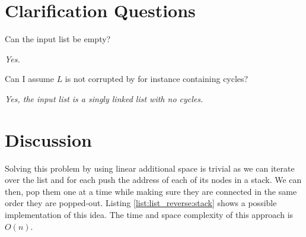

\section{Clarification Questions}

\begin{QandA}
	\item \begin{questionitem} \begin{question} Can the input list be empty?   \end{question} 	 
    \begin{answered}
		\textit{Yes.}
	\end{answered} \end{questionitem}

	\item \begin{questionitem} \begin{question} Can I assume $L$ is not corrupted by for instance containing cycles?   \end{question} 	 
    \begin{answered}
		\textit{Yes, the input list is a singly linked list with no cycles.}
	\end{answered} \end{questionitem}
	
\end{QandA}

\section{Discussion}
\label{list_reverse:sec:discussion}
Solving this problem by using linear additional space is  trivial as we can iterate over the list
and for each push the address of each of its nodes in a stack. We can then, pop them one at a time
while making sure they are connected in the same order they are popped-out. Listing
\ref{list:list_reverse:stack} shows a possible implementation of this idea. The time and space
complexity of this approach is $O(n)$.




